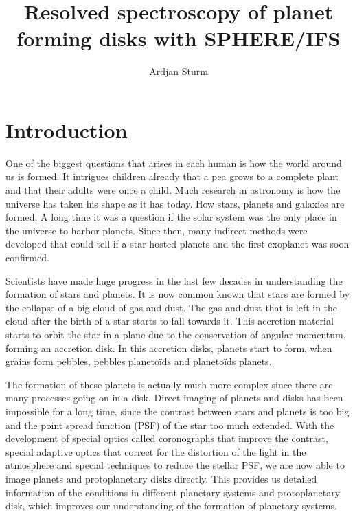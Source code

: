 \documentclass[twoside,single]{lion-msc}
\title{Resolved spectroscopy of planet forming disks with SPHERE/IFS}
\author{Ardjan Sturm}
\affiliation{Huygens-Kamerlingh Onnes Laboratory, Leiden University}   %
\begin{document}

\maketitle

\tableofcontents
\cleardoublepage



\chapter{Introduction}
One of the biggest questions that arises in each human is how the world around us is formed. It intrigues children already that a pea grows to a complete plant and that their adults were once a child. Much research in astronomy is how the universe has taken his shape as it has today. How stars, planets and galaxies are formed. A long time it was a question if the solar system was the only place in the universe to harbor planets. Since then, many indirect methods were developed that could tell if a star hosted planets and the first exoplanet was soon confirmed.
\bigskip

Scientists have made huge progress in the last few decades in understanding the formation of stars and planets. It is now common known that stars are formed by the collapse of a big cloud of gas and dust. The gas and dust that is left in the cloud after the birth of a star starts to fall towards it. This accretion material starts to orbit the star in a plane due to the conservation of angular momentum, forming an accretion disk. In this accretion disks, planets start to form, when grains form pebbles, pebbles planeto\"ids and planeto\"ids planets. 
\bigskip

The formation of these planets is actually much more complex since there are many processes going on in a disk. Direct imaging of planets and disks has been impossible for a long time, since the contrast between stars and planets is too big and the point spread function (PSF) of the star too much extended. With the development of special optics called coronographs that improve the contrast, special adaptive optics that correct for the distortion of the light in the atmosphere and special techniques to reduce the stellar PSF, we are now able to image planets and protoplanetary disks directly. This provides us detailed information of the conditions in different planetary systems and protoplanetary disk, which improves our understanding of the formation of planetary systems.
\bigskip
\end{document}
